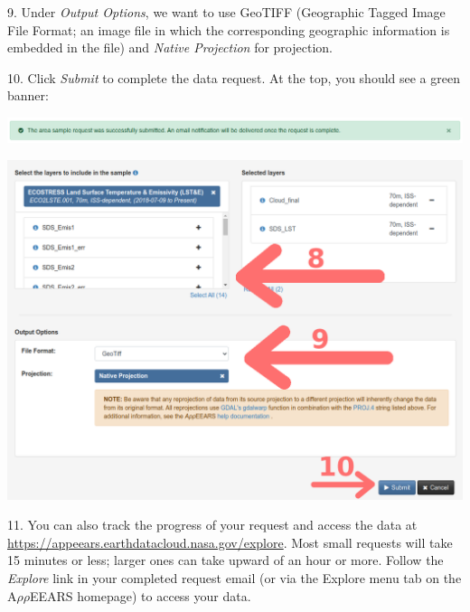 \documentclass[oneside,a4paper,11pt,explicit]{book}
\begin{document}

9. Under \textit{Output Options}, we want to use GeoTIFF (Geographic Tagged Image File Format; an image file in which the corresponding geographic information is embedded in the file) and \textit{Native Projection} for projection.

10. Click \textit{Submit} to complete the data request. At the top, you should see a green banner:

\centerline{\includegraphics[width=\textwidth]{RequestSuccess.png}}

\centerline{\includegraphics[width=\textwidth]{LayerSettings.png}}

11. You can also track the progress of your request and access the data at \url{https://appeears.earthdatacloud.nasa.gov/explore}. Most small requests will take 15 minutes or less; larger ones can take upward of an hour or more. Follow the \textit{Explore} link in your completed request email (or via the Explore menu tab on the A$\rho\rho$EEARS homepage) to access your data.

\end{document}
